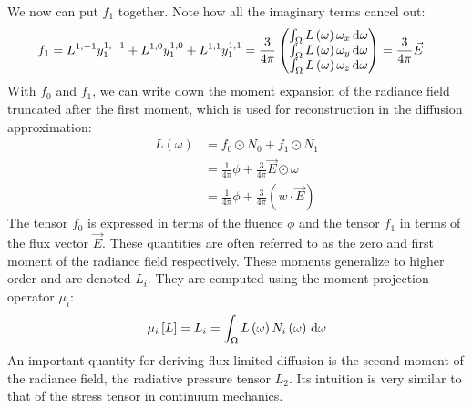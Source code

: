 We now can put $f_1$ together. Note how all the imaginary terms cancel out:
\begin{align}
f_1 &= 
L^{1,-1}y^{1,-1}_1+L^{1,0}y^{1,0}_1+L^{1,1}y^{1,1}_1
=
\frac{3}{4\pi}
\begin{pmatrix}
\int_\Omega{L\left(\omega\right)\omega_x\,\mathrm{d}\omega}
\\
\int_\Omega{L\left(\omega\right)\omega_y\,\mathrm{d}\omega}
\\
\int_\Omega{L\left(\omega\right)\omega_z\,\mathrm{d}\omega}
\end{pmatrix}
=
\frac{3}{4\pi}\vec{E}
\end{align}
With $f_0$ and $f_1$, we can write down the moment expansion of the radiance field truncated after the first moment, which is used for reconstruction in the diffusion approximation:
\begin{align}
\nonumber
L\left(\omega\right) &= 
f_0\odot N_0 + f_1\odot N_1
\\
\nonumber
&=
\frac{1}{4\pi}\phi + \frac{3}{4\pi}\vec{E} \odot \omega
\\
\label{eq:moment_expansion_L}
&=
\frac{1}{4\pi}\phi + \frac{3}{4\pi}\left(w \cdot \vec{E}\right)
\end{align}
The tensor $f_0$ is expressed in terms of the fluence $\phi$ and the tensor $f_1$ in terms of the flux vector $\vec{E}$. These quantities are often referred to as the zero and first moment of the radiance field respectively. These moments generalize to higher order and are denoted $L_i$. They are computed using the moment projection operator $\mu_i$:
\begin{align}
\label{eq:moment_expansion_mu}
\mu_i\left[L\right] = L_i = \int_\Omega{L\left(\omega\right)N_i\left(\omega\right)\,\mathrm{d}\omega}
\end{align}
An important quantity for deriving flux-limited diffusion is the second moment of the radiance field, the radiative pressure tensor $L_2$. Its intuition is very similar to that of the stress tensor in continuum mechanics.

